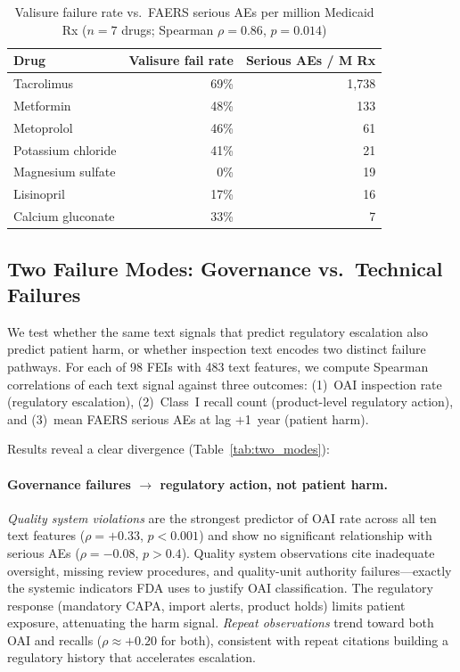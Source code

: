 \documentclass[12pt]{article}
\begin{document}
\begin{table}[h!]
\centering
\small
\caption{Valisure failure rate vs.\ FAERS serious AEs per million Medicaid Rx
         ($n = 7$ drugs; Spearman $\rho = 0.86$, $p = 0.014$)}
\label{tab:valisure_val}
\begin{tabular}{lrr}
\toprule
\textbf{Drug} & \textbf{Valisure fail rate} & \textbf{Serious AEs / M Rx} \\
\midrule
Tacrolimus         & 69\% & 1{,}738 \\
Metformin          & 48\% &   133 \\
Metoprolol         & 46\% &    61 \\
Potassium chloride & 41\% &    21 \\
Magnesium sulfate  &  0\% &    19 \\
Lisinopril         & 17\% &    16 \\
Calcium gluconate  & 33\% &     7 \\
\bottomrule
\end{tabular}
\end{table}

\subsection{Two Failure Modes: Governance vs.\ Technical Failures}

We test whether the same text signals that predict regulatory escalation also
predict patient harm, or whether inspection text encodes two distinct failure
pathways.
For each of 98 FEIs with 483 text features, we compute Spearman correlations
of each text signal against three outcomes: (1)~OAI inspection rate
(regulatory escalation), (2)~Class~I recall count (product-level regulatory
action), and (3)~mean FAERS serious AEs at lag $+$1~year (patient harm).

Results reveal a clear divergence (Table~\ref{tab:two_modes}):

\paragraph{Governance failures $\to$ regulatory action, not patient harm.}
\emph{Quality system violations} are the strongest predictor of OAI rate
across all ten text features ($\rho = +0.33$, $p < 0.001$) and show no
significant relationship with serious AEs ($\rho = -0.08$, $p > 0.4$).
Quality system observations cite inadequate oversight, missing review
procedures, and quality-unit authority failures---exactly the systemic
indicators FDA uses to justify OAI classification.
The regulatory response (mandatory CAPA, import alerts, product holds) limits
patient exposure, attenuating the harm signal.
\emph{Repeat observations} trend toward both OAI and recalls ($\rho \approx
+0.20$ for both), consistent with repeat citations building a regulatory
history that accelerates escalation.
\end{document}
